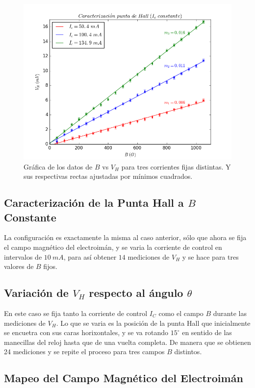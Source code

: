 \documentclass[twocolumn,showpacs,preprintnumbers,amsmath,amssymb]{revtex4-1}
\begin{document}
\begin{figure}
\includegraphics[scale=0.46]{figura_4.png}
\caption{\label{fig:epsart}Gráfica de los datos de $B$ vs $V_H$ para tres corrientes fijas distintas. Y sus respectivas rectas ajustadas
por mínimos cuadrados.}
\end{figure}

\subsection{Caracterización de la Punta Hall a $B$ Constante}

La configuración es exactamente la misma al caso anterior, sólo que ahora se fija el campo magnético del electroimán, y se varia
la corriente de control en intervalos de $10\ mA$, para así obtener $14$ mediciones de $V_H$ y se hace para tres valores de $B$ fijos.

\subsection{Variación de $V_H$ respecto al ángulo $\theta$}

En este caso se fija tanto la corriente de control $I_C$ como el campo $B$ durante las mediciones de $V_H$. Lo que se varia
es la posición de la punta Hall que inicialmente se encuetra con sus caras horixontales, y se va rotando $15^\circ$ en sentido de las
manecillas del reloj hasta que de una vuelta completa. De manera que se obtienen 24 mediciones y se repite el proceso para
tres campos $B$ distintos.

\subsection{Mapeo del Campo Magnético del Electroimán}
\end{document}
